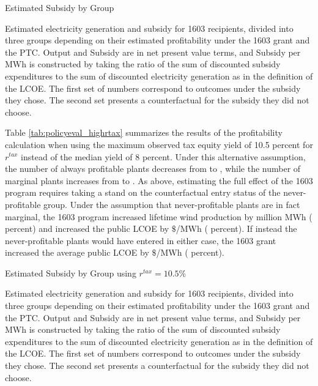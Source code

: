 \documentclass[12pt]{article}
\begin{document}
\begin{table}[H]
\caption{Estimated Subsidy by Group\label{tab:policyeval}}
\vspace{-15pt}

\footnotesize
Estimated electricity generation and subsidy for 1603 recipients, divided into three groups depending on their estimated profitability under the 1603 grant and the PTC. Output and Subsidy are in net present value terms, and Subsidy per MWh is constructed by taking the ratio of the sum of discounted subsidy expenditures to the sum of discounted electricity generation as in the definition of the LCOE. The first set of numbers correspond to outcomes under the subsidy they chose. The second set presents a counterfactual for the subsidy they did not choose.
\end{table}

Table \ref{tab:policyeval_highrtax} summarizes the results of the profitability calculation when using the maximum observed tax equity yield of 10.5 percent for $r^{tax}$ instead of the median yield of 8 percent. Under this alternative assumption, the number of always profitable plants decreases from  \unskip to \unskip, while the number of marginal plants increases from  \unskip to \unskip. As above, estimating the full effect of the 1603 program requires taking a stand on the counterfactual entry status of the never-profitable group. Under the assumption that never-profitable plants are in fact marginal, the 1603 program increased lifetime wind production by million MWh ( \unskip percent) and increased the public LCOE by $\$  $/MWh ( \unskip percent). If instead the never-profitable plants would have entered in either case, the 1603 grant increased the average public LCOE by $\$  $/MWh ( \unskip percent).

\begin{table}[H]
\caption{Estimated Subsidy by Group using $r^{tax} = 10.5\%$\label{tab:policyeval_highrtax}}
\vspace{-15pt}

\footnotesize
Estimated electricity generation and subsidy for 1603 recipients, divided into three groups depending on their estimated profitability under the 1603 grant and the PTC. Output and Subsidy are in net present value terms, and Subsidy per MWh is constructed by taking the ratio of the sum of discounted subsidy expenditures to the sum of discounted electricity generation as in the definition of the LCOE. The first set of numbers correspond to outcomes under the subsidy they chose. The second set presents a counterfactual for the subsidy they did not choose.
\end{table}
\end{document}
